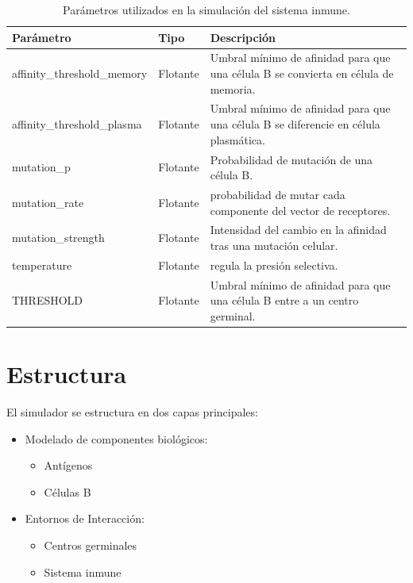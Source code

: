 \begin{table}[H]
\centering
\caption{Parámetros utilizados en la simulación del sistema inmune.}
\label{tab:parametros_simulacion2}
\begin{tabular}{|l|p{2cm}|p{5cm}|}
\hline
\textbf{Parámetro} & \textbf{Tipo} & \textbf{Descripción} \\ \hline

affinity\_threshold\_memory & Flotante & Umbral mínimo de afinidad para que una célula B se convierta en célula de memoria. \\ \hline
affinity\_threshold\_plasma & Flotante & Umbral mínimo de afinidad para que una célula B se diferencie en célula plasmática. \\ \hline
mutation\_p & Flotante & Probabilidad de mutación de una célula B. \\ \hline
mutation\_rate & Flotante & probabilidad de mutar cada componente del vector de receptores. \\ \hline
mutation\_strength & Flotante & Intensidad del cambio en la afinidad tras una mutación celular. \\ \hline
temperature & Flotante & regula la presión selectiva. \\ \hline
THRESHOLD & Flotante & Umbral mínimo de afinidad para que una célula B entre a un centro germinal. \\ \hline
\end{tabular}
\end{table}


\section{Estructura}
El simulador se estructura en dos capas principales:
\begin{itemize}
    \item Modelado de componentes biológicos:
        \begin{itemize}
            \item Antígenos
            \item Células B
        \end{itemize}
    \item Entornos de Interacción:
        \begin{itemize}
            \item Centros germinales
            \item Sistema inmune
        \end{itemize}
\end{itemize}
